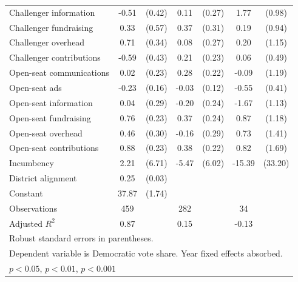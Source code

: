 \documentclass{article}
\begin{document}
\begin{table}
\begin{tabular}{l*{3}{cc}}
Challenger information&       -0.51         &      (0.42)&        0.11         &      (0.27)&        1.77         &      (0.98)\\
Challenger fundraising&        0.33         &      (0.57)&        0.37         &      (0.31)&        0.19         &      (0.94)\\
Challenger overhead &        0.71\sym{*}  &      (0.34)&        0.08         &      (0.27)&        0.20         &      (1.15)\\
Challenger contributions&       -0.59         &      (0.43)&        0.21         &      (0.23)&        0.06         &      (0.49)\\ \midrule
Open-seat communications&        0.02         &      (0.23)&        0.28         &      (0.22)&       -0.09         &      (1.19)\\
Open-seat ads       &       -0.23         &      (0.16)&       -0.03         &      (0.12)&       -0.55         &      (0.41)\\
Open-seat information&        0.04         &      (0.29)&       -0.20         &      (0.24)&       -1.67         &      (1.13)\\
Open-seat fundraising&        0.76\sym{**} &      (0.23)&        0.37         &      (0.24)&        0.87         &      (1.18)\\
Open-seat overhead  &        0.46         &      (0.30)&       -0.16         &      (0.29)&        0.73         &      (1.41)\\
Open-seat contributions&        0.88\sym{***}&      (0.23)&        0.38         &      (0.22)&        0.82         &      (1.69)\\ \midrule Incumbency          &        2.21         &      (6.71)&       -5.47         &      (6.02)&      -15.39         &     (33.20)\\
District alignment  &        0.25\sym{***}&      (0.03)&                     &            &                     &            \\
Constant            &       37.87\sym{***}&      (1.74)&                     &            &                     &            \\
\midrule
Observations        &         459         &            &         282         &            &          34         &            \\
Adjusted \(R^{2}\)  &        0.87         &            &        0.15         &            &       -0.13         &            \\
\bottomrule
\multicolumn{7}{l}{\footnotesize Robust standard errors in parentheses.}\\
\multicolumn{7}{l}{\footnotesize Dependent variable is Democratic vote share. Year fixed effects absorbed.}\\
\multicolumn{7}{l}{\footnotesize \sym{*} \(p<0.05\), \sym{**} \(p<0.01\), \sym{***} \(p<0.001\)}\\
\end{tabular}
\end{table}
\end{document}

